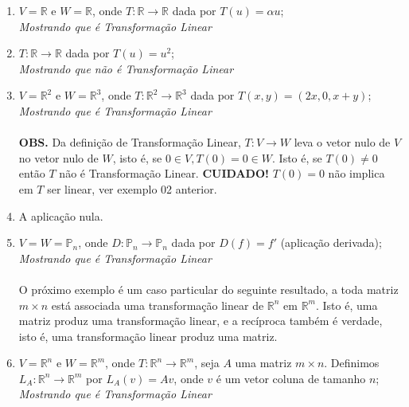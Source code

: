 \documentclass[oneside,a4paper,12pt]{article}
\begin{document}
\begin{enumerate}
	\item $V = \mathbb{R}$ e $W = \mathbb{R}$, onde $T: \mathbb{R} \rightarrow \mathbb{R}$ dada por $T(u) = \alpha u$;
	\\ \emph{Mostrando que é Transformação Linear}
	\\ \vspace{150pt}
	\item $T: \mathbb{R} \rightarrow \mathbb{R}$ dada por $T(u) = u^2$;
	\\ \emph{Mostrando que não é Transformação Linear}
	\\ \vspace{150pt}
	\item $V = \mathbb{R}^2$ e $W = \mathbb{R}^3$, onde $T: \mathbb{R}^2 \rightarrow \mathbb{R}^3$ dada por $T(x,y) = (2x,0,x+y)$;
	\\ \emph{Mostrando que é Transformação Linear}
	\\ \vspace{200pt}
	\\ {\bf OBS.} Da definição de Transformação Linear, $T:V \rightarrow W$ leva o vetor nulo de $V$ no vetor nulo de $W$, isto é, se $0 \in V, T(0) = 0 \in W$. Isto é, se $T(0) \neq 0$ então $T$ não é Transformação Linear. {\bf CUIDADO!} $T(0) = 0$ não implica em $T$ ser linear, ver exemplo 02 anterior.
	\item A aplicação nula.
	\item $V = W = \mathbb{P}_n$, onde $D: \mathbb{P}_n \rightarrow \mathbb{P}_n$ dada por $D(f) = f'$ (aplicação derivada);
	\\ \emph{Mostrando que é Transformação Linear}
	\\ \vspace{200pt}
	\\ O próximo exemplo é um caso particular do seguinte resultado, a toda matriz $m \times n$ está associada uma transformação linear de $\mathbb{R}^n$ em $\mathbb{R}^m$. Isto é, uma matriz produz uma transformação linear, e a recíproca também é verdade, isto é, uma transformação linear produz uma matriz.
	\item $V = \mathbb{R}^n$ e $W = \mathbb{R}^m$, onde $T: \mathbb{R}^n \rightarrow \mathbb{R}^m$, seja $A$ uma matriz $m \times n$. Definimos $L_{A}:\mathbb{R}^n \rightarrow \mathbb{R}^m$ por $L_{A}(v) = A v$, onde $v$ é um vetor coluna de tamanho $n$;
	\\ \emph{Mostrando que é Transformação Linear}
	\\ \vspace{250pt}
\end{enumerate}
\end{document}
